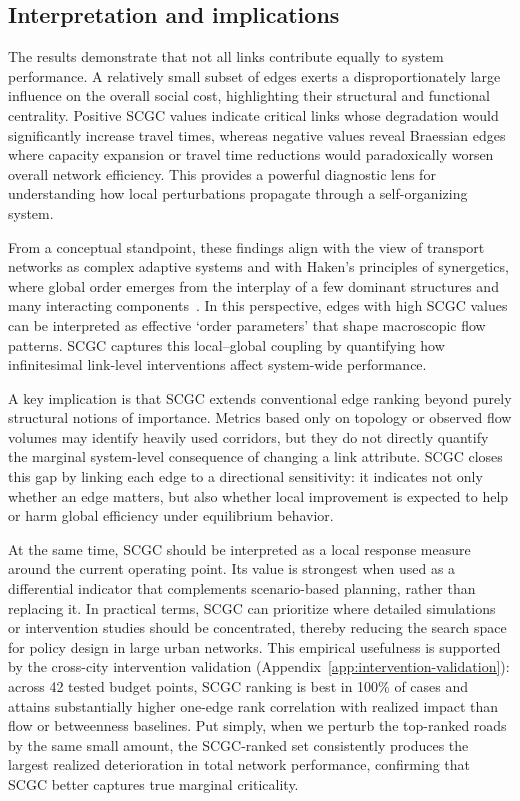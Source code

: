 \documentclass[twocolumn,english,groupedaddress, superscriptaddress,aps,pre,10pt,floatfix]{revtex4-2}
\begin{document}
\subsection{Interpretation and implications}

The results demonstrate that not all links contribute equally to system performance. A relatively small subset of edges exerts a disproportionately large influence on the overall social cost, highlighting their structural and functional centrality. Positive SCGC values indicate critical links whose degradation would significantly increase travel times, whereas negative values reveal Braessian edges where capacity expansion or travel time reductions would paradoxically worsen overall network efficiency. This provides a powerful diagnostic lens for understanding how local perturbations propagate through a self-organizing system.

From a conceptual standpoint, these findings align with the view of transport networks as complex adaptive systems and with Haken’s principles of synergetics, where global order emerges from the interplay of a few dominant structures and many interacting components~\cite{haken1983}. In this perspective, edges with high SCGC values can be interpreted as effective `order parameters' that shape macroscopic flow patterns. SCGC captures this local--global coupling by quantifying how infinitesimal link-level interventions affect system-wide performance.

A key implication is that SCGC extends conventional edge ranking beyond purely structural notions of importance. Metrics based only on topology or observed flow volumes may identify heavily used corridors, but they do not directly quantify the marginal system-level consequence of changing a link attribute. SCGC closes this gap by linking each edge to a directional sensitivity: it indicates not only whether an edge matters, but also whether local improvement is expected to help or harm global efficiency under equilibrium behavior.

At the same time, SCGC should be interpreted as a local response measure around the current operating point. Its value is strongest when used as a differential indicator that complements scenario-based planning, rather than replacing it. In practical terms, SCGC can prioritize where detailed simulations or intervention studies should be concentrated, thereby reducing the search space for policy design in large urban networks.
This empirical usefulness is supported by the cross-city intervention validation (Appendix~\ref{app:intervention-validation}): across 42 tested budget points, SCGC ranking is best in 100\% of cases and attains substantially higher one-edge rank correlation with realized impact than flow or betweenness baselines.
Put simply, when we perturb the top-ranked roads by the same small amount, the SCGC-ranked set consistently produces the largest realized deterioration in total network performance, confirming that SCGC better captures true marginal criticality.
\end{document}
